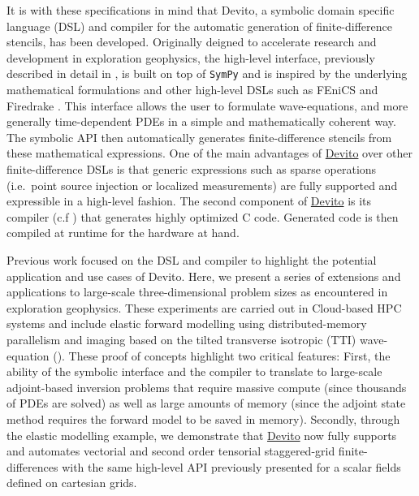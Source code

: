 \documentclass[conference]{IEEEtran}
\begin{document}
It is with these specifications in mind that Devito, a symbolic domain
specific language (DSL) and compiler for the automatic generation of
finite-difference stencils, has been developed. Originally deigned to
accelerate research and development in exploration geophysics, the
high-level interface, previously described in detail in
\cite{devito-api}, is built on top of \texttt{SymPy} \cite{sympy} and
is inspired by the underlying mathematical formulations and other
high-level DSLs such as FEniCS \cite{fenics} and Firedrake
\cite{firedrake}. This interface allows the user to formulate
wave-equations, and more generally time-dependent PDEs in a simple and
mathematically coherent way. The symbolic API then automatically
generates finite-difference stencils from these mathematical
expressions. One of the main advantages of
\href{https://github.com/devitocodes/devito}{Devito} over other
finite-difference DSLs is that generic expressions such as sparse
operations (i.e.~point source injection or localized measurements) are
fully supported and expressible in a high-level fashion. The second
component of \href{https://github.com/devitocodes/devito}{Devito} is its
compiler (c.f \cite{devito-compiler}) that generates highly optimized C
code. Generated code is then compiled at runtime for the hardware at
hand.

Previous work focused on the DSL and compiler to highlight the potential
application and use cases of Devito. Here, we present a series of
extensions and applications to large-scale three-dimensional problem
sizes as encountered in exploration geophysics. These experiments are
carried out in Cloud-based HPC systems and include elastic forward
modelling using distributed-memory parallelism and imaging based on the
tilted transverse isotropic (TTI) wave-equation
(\cite{virieux, thomsen, zhang-tti, duveneck, louboutin2018segeow}).
These proof of concepts highlight two critical features: First, the
ability of the symbolic interface and the compiler to translate to
large-scale adjoint-based inversion problems that require massive
compute (since thousands of PDEs are solved) as well as large amounts of
memory (since the adjoint state method requires the forward model to be
saved in memory). Secondly, through the elastic modelling example, we
demonstrate that \href{https://github.com/devitocodes/devito}{Devito}
now fully supports and automates vectorial and second order tensorial
staggered-grid finite-differences with the same high-level API
previously presented for a scalar fields defined on cartesian grids.
\end{document}
